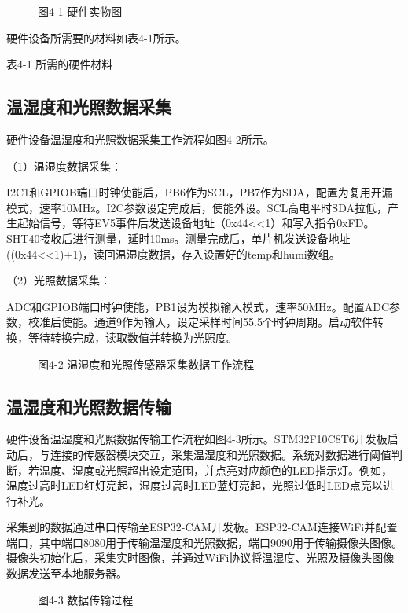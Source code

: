 \documentclass[12pt, a4paper, twoside]{ctexart}
\begin{document}
\begin{figure}[htbp]
\centering
\caption{图4-1 硬件实物图}
\end{figure}

硬件设备所需要的材料如表4-1所示。

表4-1 所需的硬件材料


\subsection{温湿度和光照数据采集}

硬件设备温湿度和光照数据采集工作流程如图4-2所示。

（1）温湿度数据采集：

I2C1和GPIOB端口时钟使能后，PB6作为SCL，PB7作为SDA，配置为复用开漏模式，速率10MHz。I2C参数设定完成后，使能外设。SCL高电平时SDA拉低，产生起始信号，等待EV5事件后发送设备地址（0x44<<1）和写入指令0xFD。SHT40接收后进行测量，延时10ms。测量完成后，单片机发送设备地址((0x44<<1)+1)，读回温湿度数据，存入设置好的temp和humi数组。

（2）光照数据采集：

ADC和GPIOB端口时钟使能，PB1设为模拟输入模式，速率50MHz。配置ADC参数，校准后使能。通道9作为输入，设定采样时间55.5个时钟周期。启动软件转换，等待转换完成，读取数值并转换为光照度。


\begin{figure}[htbp]
\centering
\caption{图4-2 温湿度和光照传感器采集数据工作流程}
\end{figure}


\subsection{温湿度和光照数据传输}

硬件设备温湿度和光照数据传输工作流程如图4-3所示。STM32F10C8T6开发板启动后，与连接的传感器模块交互，采集温湿度和光照数据。系统对数据进行阈值判断，若温度、湿度或光照超出设定范围，并点亮对应颜色的LED指示灯。例如，温度过高时LED红灯亮起，湿度过高时LED蓝灯亮起，光照过低时LED点亮以进行补光。

采集到的数据通过串口传输至ESP32-CAM开发板。ESP32-CAM连接WiFi并配置端口，其中端口8080用于传输温湿度和光照数据，端口9090用于传输摄像头图像。摄像头初始化后，采集实时图像，并通过WiFi协议将温湿度、光照及摄像头图像数据发送至本地服务器。


\begin{figure}[htbp]
\centering
\caption{图4-3 数据传输过程}
\end{figure}
\end{document}
